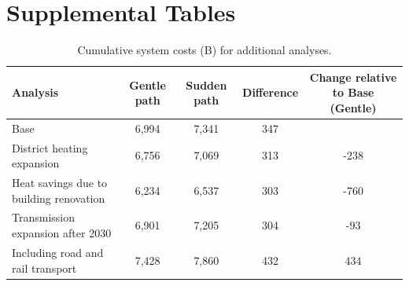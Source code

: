 \documentclass[3p]{elsarticle} %
\begin{document}









\section{Supplemental Tables}
\begin{table}[!h]
\footnotesize
\centering
\begin{threeparttable}
\caption{Cumulative system costs (B\EUR) for additional analyses.} \label{tab_additional_analyses}
\centering
\begin{tabularx}{17cm}{lcccc}
\toprule
Analysis & Gentle path & Sudden path & Difference & Change relative to Base (Gentle) \\
\midrule
Base	& 6,994	& 7,341	& 347 & \\
District heating expansion	& 6,756	& 7,069	& 313 & -238 \\
Heat savings due to building renovation	& 6,234	& 6,537	& 303 & -760 \\
Transmission expansion after 2030 & 6,901 &	7,205	& 304 & -93 \\
Including road and rail transport &	7,428	& 7,860 &	432 & 434  \\
\bottomrule
\end{tabularx}
\end{threeparttable}
\end{table}
\clearpage
\end{document}
